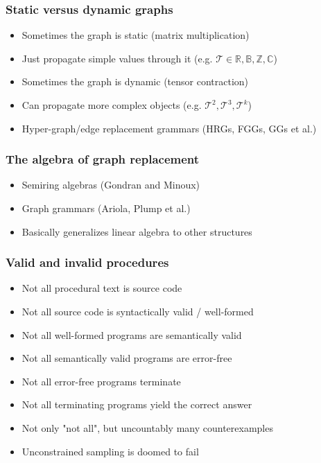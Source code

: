 \documentclass{beamer}
\begin{document}
  \begin{frame}
    \frametitle{Static versus dynamic graphs}
    \begin{itemize}
      \item Sometimes the graph is static (matrix multiplication)
      \item Just propagate simple values through it (e.g. $\mathcal{T} \in {\mathbb{R, B, Z, C}}$)
      \item Sometimes the graph is dynamic (tensor contraction)
      \item Can propagate more complex objects (e.g. $\mathcal{T}^2, \mathcal{T}^3, \mathcal{T}^k$)
      \item Hyper-graph/edge replacement grammars (HRGs, FGGs, GGs et al.)
    \end{itemize}
  \end{frame}

  \begin{frame}
    \frametitle{The algebra of graph replacement}
    \begin{itemize}
      \item Semiring algebras (Gondran and Minoux)
      \item Graph grammars (Ariola, Plump et al.)
      \item Basically generalizes linear algebra to other structures
    \end{itemize}
  \end{frame}

  \begin{frame}
    \frametitle{Valid and invalid procedures}
    \begin{itemize}
      \item Not all procedural text is source code
      \item Not all source code is syntactically valid / well-formed
      \item Not all well-formed programs are semantically valid
      \item Not all semantically valid programs are error-free
      \item Not all error-free programs terminate
      \item Not all terminating programs yield the correct answer
      \item Not only "not all", but uncountably many counterexamples
      \item Unconstrained sampling is doomed to fail
    \end{itemize}
  \end{frame}
\end{document}
